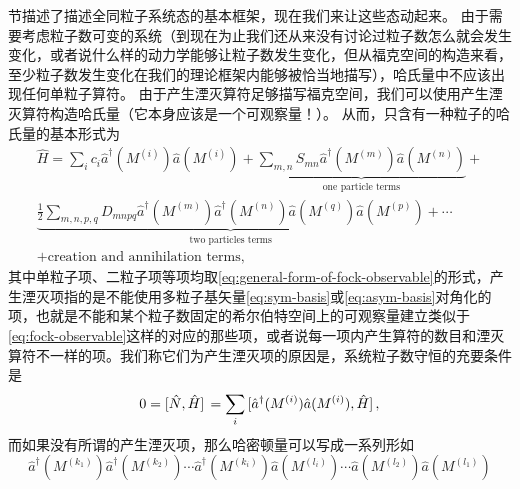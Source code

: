 \documentclass[hyperref, UTF8, a4paper]{ctexart}
\renewcommand{\autoref}{\prettyref}
\begin{document}

\autoref{sec:many-body-state}节描述了描述全同粒子系统态的基本框架，现在我们来让这些态动起来。
由于需要考虑粒子数可变的系统（到现在为止我们还从来没有讨论过粒子数怎么就会发生变化，或者说什么样的动力学能够让粒子数发生变化，但从福克空间的构造来看，至少粒子数发生变化在我们的理论框架内能够被恰当地描写），哈氏量中不应该出现任何单粒子算符。
由于产生湮灭算符足够描写福克空间，我们可以使用产生湮灭算符构造哈氏量（它本身应该是一个可观察量！）。
从而，只含有一种粒子的哈氏量的基本形式为
\begin{equation}
    \begin{split}
        \hat{H} = \sum_i c_i \hat{a}^\dagger (M^{(i)}) \hat{a} (M^{(i)}) + \underbrace{\sum_{m, n} S_{mn} \hat{a}^\dagger (M^{(m)}) \hat{a} (M^{(n)}) }_\text{one particle terms} + \\
        \underbrace{\frac{1}{2} \sum_{m, n, p, q} D_{mnpq} \hat{a}^\dagger (M^{(m)}) \hat{a}^\dagger (M^{(n)}) \hat{a} (M^{(q)}) \hat{a} (M^{(p)}) }_\text{two particles terms} + \cdots \\
        + \text{creation and annihilation terms},
    \end{split}
    \label{eq:one-kind-many-body-hamitonian}
\end{equation}
其中单粒子项、二粒子项等项均取\eqref{eq:general-form-of-fock-observable}的形式，产生湮灭项指的是不能使用多粒子基矢量\eqref{eq:sym-basis}或\eqref{eq:asym-basis}对角化的项，也就是不能和某个粒子数固定的希尔伯特空间上的可观察量建立类似于\eqref{eq:fock-observable}这样的对应的那些项，或者说每一项内产生算符的数目和湮灭算符不一样的项。我们称它们为产生湮灭项的原因是，系统粒子数守恒的充要条件是
\begin{equation}
    0 = \comm*{\hat{N}}{\hat{H}} = \sum_i \comm*{\hat{a}^\dagger (M^{(i)}) \hat{a} (M^{(i)})}{\hat{H}},
\end{equation}
而如果没有所谓的产生湮灭项，那么哈密顿量可以写成一系列形如
\[
    \hat{a}^\dagger (M^{(k_1)}) \hat{a}^\dagger (M^{(k_2)}) \cdots \hat{a}^\dagger (M^{(k_i)}) \hat{a} (M^{(l_i)}) \cdots \hat{a} (M^{(l_2)}) \hat{a} (M^{(l_1)})
\]
\end{document}
